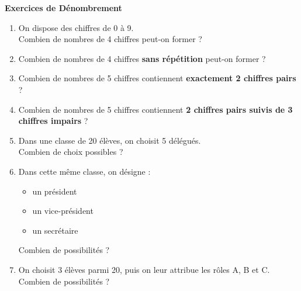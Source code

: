 \documentclass[12pt]{article}
\begin{document}
\begin{center}
    \Large \textbf{Exercices de Dénombrement}
\end{center}

\vspace{0.5cm}

\begin{enumerate}[label=\textbf{Exercice \arabic*.}]

\item On dispose des chiffres de 0 à 9.\\
Combien de nombres de 4 chiffres peut-on former ?

\vspace{0.3cm}

\item Combien de nombres de 4 chiffres \textbf{sans répétition} peut-on former ?

\vspace{0.3cm}

\item Combien de nombres de 5 chiffres contiennent \textbf{exactement 2 chiffres pairs} ?

\vspace{0.3cm}

\item Combien de nombres de 5 chiffres contiennent \textbf{2 chiffres pairs suivis de 3 chiffres impairs} ?

\vspace{0.3cm}

\item Dans une classe de 20 élèves, on choisit 5 délégués.\\
Combien de choix possibles ?

\vspace{0.3cm}

\item Dans cette même classe, on désigne :
\begin{itemize}
    \item un président
    \item un vice-président
    \item un secrétaire
\end{itemize}
Combien de possibilités ?

\vspace{0.3cm}

\item On choisit 3 élèves parmi 20, puis on leur attribue les rôles A, B et C.\\
Combien de possibilités ?


\end{enumerate}
\end{document}
